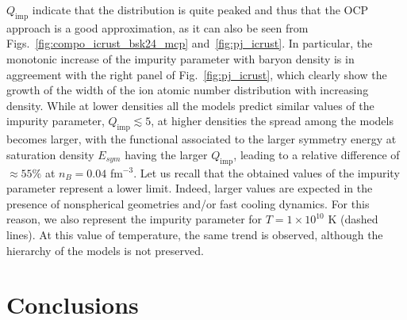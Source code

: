 $Q_{\text{imp}}$ indicate that the distribution is quite peaked and thus that 
the OCP approach is a good approximation, as it can also be seen from
Figs.~\ref{fig:compo_icrust_bsk24_mcp} and~\ref{fig:pj_icrust}. In particular, 
the monotonic increase of the impurity parameter with baryon density is in 
aggreement with the right panel of Fig.~\ref{fig:pj_icrust}, which clearly show 
the growth of the width of the ion atomic number distribution with increasing 
density. 
%
While at lower densities all the models predict similar values of the impurity 
parameter, $Q_{\text{imp}} \lesssim 5$, at higher densities the spread among 
the models becomes larger, with the functional associated to the larger 
symmetry energy at saturation density $E_{sym}$ having the larger 
$Q_{\text{imp}}$, leading to a relative difference of $\approx 55\%$ at $n_B
= 0.04$ fm$^{-3}$. 
Let us recall that the obtained values of the impurity parameter represent a
lower limit. Indeed, larger values are expected in the presence of nonspherical
geometries and/or fast cooling dynamics. For this reason, we also represent the
impurity parameter for $T= 1\times 10^{10}$ K (dashed 
lines). At this value of temperature, the same trend is observed, although the 
hierarchy of the models is not preserved.

\section{Conclusions}\label{sec:conclu3}

